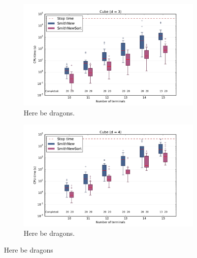 \begin{figure}[htbp]
  \centering
  \begin{subfigure}[t]{0.5\textwidth}
    \includegraphics[width=\textwidth]{gfx/boxplots/plot_nvst_boxplot_d3_Cube_2}
  \caption{Here be dragons.\label{fig:boxplot-d3-cube-2}}
  \end{subfigure}%
  \begin{subfigure}[t]{0.5\textwidth}
    \includegraphics[width=\textwidth]{gfx/boxplots/plot_nvst_boxplot_d4_Cube_2}
  \caption{Here be dragons.\label{fig:boxplot-d3-cube-2}}
  \end{subfigure}%
  \caption[Here be dragons]{Here be dragons\label{fig:boxplot-cube-2}}
\end{figure}

